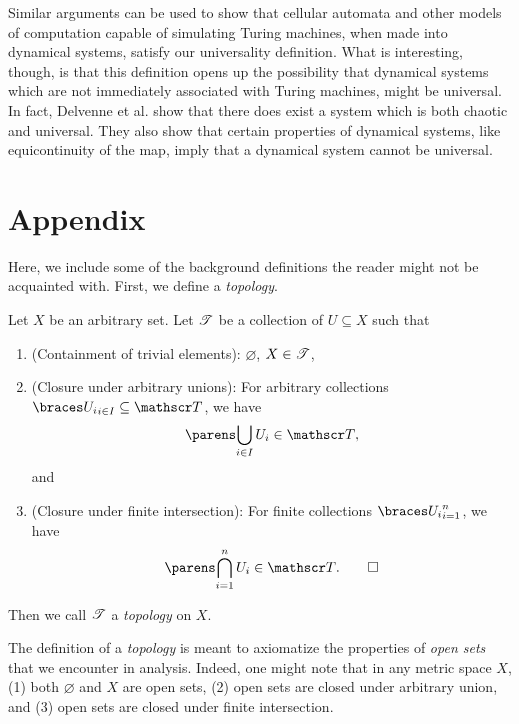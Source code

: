 \documentclass{fkpaper}
\begin{document}
\begin{multicols}{2}
Similar arguments can be used to show that cellular automata and other models of computation capable of simulating Turing machines, when made into dynamical systems, satisfy our universality definition. What is interesting, though, is that this definition opens up the possibility that dynamical systems which are not immediately associated with Turing machines, might be universal. In fact, Delvenne et al. show that there does exist a system which is both chaotic and universal. They also show that certain properties of dynamical systems, like equicontinuity of the map, imply that a dynamical system cannot be universal.







\section{Appendix}
Here, we include some of the background definitions the reader might
not be acquainted with. First, we define a \emph{topology}.
\begin{definition}[Topology]
  Let $X$ be an arbitrary set. Let ${\mathscr{T}}$ be a collection of $U
  \subseteq X$ such that
  \begin{enumerate}
    \item (Containment of trivial elements): $\varnothing$, $X \in {\mathscr{T}}$,
    \item (Closure under arbitrary unions): For arbitrary collections
      $\set{U_i}_{i \in I} \subseteq \ms T$, we have
      \[
      \pn{\bigcup_{i \in I} U_i } \in \ms T,
      \]
      and
    \item (Closure under finite intersection): For finite collections
      $\set{U_i}_{i = 1}^n$, we have
      \[
      \pn{\bigcap_{i=1}^n U_i} \in \ms T. \qedhere
      \]
  \end{enumerate}
  Then we call ${\mathscr{T}}$ a \emph{topology} on $X$.
\end{definition}
The definition of a \emph{topology} is meant to axiomatize the
properties of \emph{open sets} that we encounter in analysis. Indeed,
one might note that in any metric space $X$, (1) both $\varnothing$
and $X$ are open sets, (2) open sets are closed under arbitrary union,
and (3) open sets are closed under finite intersection.


\end{multicols}
\end{document}
